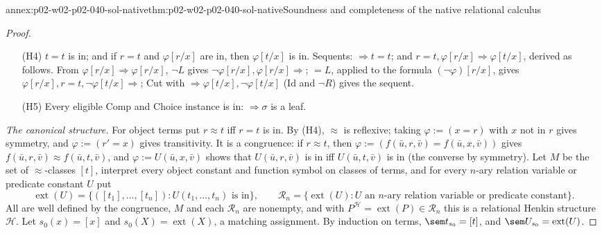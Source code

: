 \begin{annexitem}{annex:p02-w02-p02-040-sol-native}{thm:p02-w02-p02-040-sol-native}{Soundness and completeness of the native relational calculus}
\begin{proof}
\begin{enumerate}
   is in iff \(\varphi[U/X]\) is in for some such \(U\).  Sequents:
   \(\forall X^n\varphi\Rightarrow\varphi[U/X]\) and
   \(\varphi[U/X]\Rightarrow\exists X^n\varphi\) (\(\forall^2L\), \(\exists^2R\));
   the other directions are the (P2) witnesses.
 \item[(H4)] \(t=t\) is in; and if \(r=t\) and \(\varphi[r/x]\) are in, then
   \(\varphi[t/x]\) is in.  Sequents: \(\Rightarrow t=t\); and
   \(r=t,\varphi[r/x]\Rightarrow\varphi[t/x]\), derived as follows.  From
   \(\varphi[r/x]\Rightarrow\varphi[r/x]\), \(\neg L\) gives
   \(\neg\varphi[r/x],\varphi[r/x]\Rightarrow\); \({=}L\), applied to the formula
   \((\neg\varphi)[r/x]\), gives \(\varphi[r/x],r=t,\neg\varphi[t/x]\Rightarrow\);
   Cut with \(\Rightarrow\varphi[t/x],\neg\varphi[t/x]\) (Id and \(\neg R\)) gives
   the sequent.
 \item[(H5)] Every eligible Comp and Choice instance is in: \(\Rightarrow\sigma\)
   is a leaf.
\end{enumerate}

\emph{The canonical structure.}  For object terms put \(r\approx t\) iff
\(r=t\) is in.  By (H4), \(\approx\) is reflexive; taking
\(\varphi:=(x=r)\) with \(x\) not in \(r\) gives symmetry, and
\(\varphi:=(r'=x)\) gives transitivity.  It is a congruence: if \(r\approx t\),
then \(\varphi:=(f(\bar u,r,\bar v)=f(\bar u,x,\bar v))\) gives
\(f(\bar u,r,\bar v)\approx f(\bar u,t,\bar v)\), and
\(\varphi:=U(\bar u,x,\bar v)\) shows that \(U(\bar u,r,\bar v)\) is in iff
\(U(\bar u,t,\bar v)\) is in (the converse by symmetry).  Let \(M\) be the
set of \(\approx\)-classes \([t]\), interpret every object constant and
function symbol on classes of terms, and for every \(n\)-ary relation
variable or predicate constant \(U\) put
\[
 \operatorname{ext}(U)=\{([t_1],\ldots,[t_n]):U(t_1,\ldots,t_n)\text{ is in}\},
 \qquad
 \mathcal R_n=\{\operatorname{ext}(U):U\text{ an }n\text{-ary relation variable or predicate constant}\}.
\]
All are well defined by the congruence, \(M\) and each \(\mathcal R_n\) are
nonempty, and with \(P^{\mathcal H}=\operatorname{ext}(P)\in\mathcal R_n\) this is a
relational Henkin structure \(\mathcal H\).  Let \(s_0(x)=[x]\) and
\(s_0(X)=\operatorname{ext}(X)\), a matching assignment.  By induction on terms,
\(\sem t_{s_0}=[t]\), and \(\sem U_{s_0}=\operatorname{ext}(U)\).


\end{proof}
\end{annexitem}
